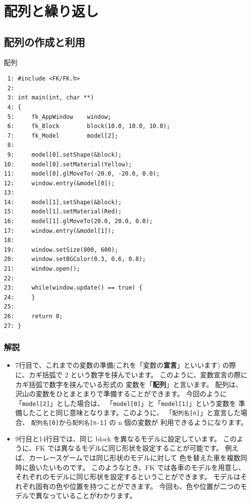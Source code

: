 ﻿\chapter{配列と繰り返し}
\section{配列の作成と利用} \label{sec:02-array}
\begin{itembox}[l]{配列}
\begin{verbatim}
 1: #include <FK/FK.h>
 2: 
 3: int main(int, char **)
 4: {
 5:     fk_AppWindow    window;
 6:     fk_Block        block(10.0, 10.0, 10.0);
 7:     fk_Model        model[2];
 8: 
 9:     model[0].setShape(&block);
10:     model[0].setMaterial(Yellow);
11:     model[0].glMoveTo(-20.0, -20.0, 0.0);
12:     window.entry(&model[0]);
13: 
14:     model[1].setShape(&block);
15:     model[1].setMaterial(Red);
16:     model[1].glMoveTo(20.0, 20.0, 0.0);
17:     window.entry(&model[1]);
18: 
19:     window.setSize(800, 600);
20:     window.setBGColor(0.3, 0.6, 0.8);
21:     window.open();
22: 
23:     while(window.update() == true) {
24:     }
25: 
26:     return 0;
27: }
\end{verbatim}
\end{itembox}
\subsection*{解説}
\begin{itemize}
 \item 7行目で、これまでの変数の準備(これを「変数の\textbf{宣言}」といいます)
	の際に、カギ括弧で 2 という数字を挟んでいます。
	このように、変数宣言の際にカギ括弧で数字を挟んでいる形式の
	変数を「\textbf{配列}」と言います。
	配列は、沢山の変数をひとまとまりで準備することができます。
	今回のように「\verb+model[2]+」とした場合は、
	「\verb+model[0]+」と「\verb+model[1]+」という変数を
	準備したことと同じ意味となります。このように、
	「\verb+配列名[n]+」と宣言した場合、
	\verb+配列名[0]+から\verb+配列名[n-1]+ の n 個の変数が
	利用できるようになります。

 \item 9行目と14行目では、同じ block を異なるモデルに設定しています。
	このように、FK では異なるモデルに同じ形状を設定することが可能です。
	例えば、カーレースゲームでは同じ形状のモデルに対して
	色を替えた車を複数同時に扱いたいものです。
	このようなとき、FK では各車のモデルを用意し、
	それぞれのモデルに同じ形状を設定するということができます。
	モデルはそれぞれ固有の色や位置を持つことができます。
	今回も、色や位置が二つのモデルで異なっていることがわかります。

\end{itemize}

